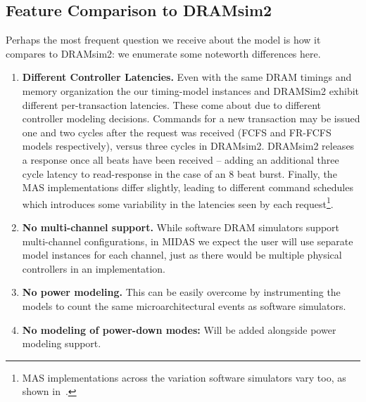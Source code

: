 \subsection{Feature Comparison to DRAMsim2}

Perhaps the most frequent question we receive about the model is how it
compares to DRAMsim2: we enumerate some noteworth differences here.

\begin{enumerate}
    \item \textbf{Different Controller Latencies.} Even with the same DRAM
        timings and memory organization the our timing-model instances and
        DRAMSim2 exhibit different per-transaction latencies. These come about
        due to different controller modeling decisions. Commands for a new
        transaction may be issued one and two cycles after the request was
        received (FCFS and FR-FCFS models respectively), versus three cycles in
        DRAMsim2. DRAMsim2 releases a response once all beats have been
        received -- adding an additional three cycle latency to read-response
        in the case of an 8 beat burst. Finally, the MAS implementations differ
        slightly, leading to different command schedules which introduces some
        variability in the latencies seen by each request\footnote{MAS
        implementations across the variation software simulators vary too, as shown
        in~\cite{ramulator}.}.

    \item \textbf{No multi-channel support.} While software DRAM simulators
        support multi-channel configurations, in MIDAS we expect the user will
        use separate model instances for each channel, just as there would be
        multiple physical controllers in an implementation.

    \item \textbf{No power modeling.} This can be easily overcome by
        instrumenting the models to count the same microarchitectural events
        as software simulators.

    \item \textbf{No modeling of power-down modes:} Will be added alongside
        power modeling support.

\end{enumerate}

